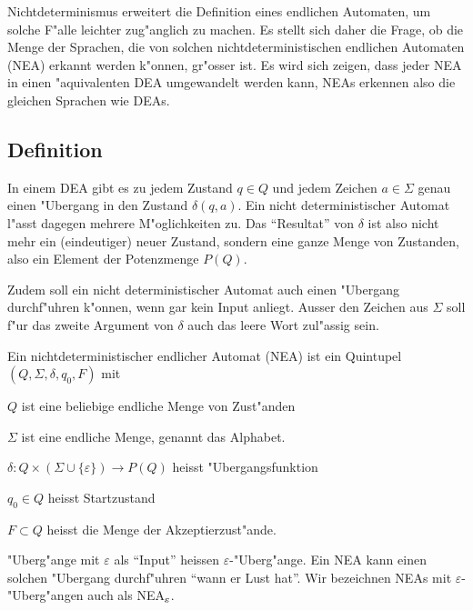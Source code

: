 Nichtdeterminismus erweitert 
die Definition eines endlichen Automaten, um solche F"alle leichter 
zug"anglich zu machen. Es stellt sich daher die Frage, ob die Menge 
der Sprachen, die von solchen nichtdeterministischen endlichen Automaten (NEA)
erkannt werden k"onnen,
gr"osser ist. Es wird sich zeigen, dass jeder NEA
in einen "aquivalenten DEA umgewandelt werden kann, NEAs erkennen also
die gleichen Sprachen wie DEAs.

\subsection{Definition\label{regulaer:definition-nea}}
In einem DEA gibt es zu jedem Zustand $q\in Q$
und jedem Zeichen $a\in\Sigma$ genau
einen "Ubergang in den Zustand $\delta(q,a)$.
Ein nicht deterministischer
Automat l"asst dagegen mehrere M"oglichkeiten zu. Das ``Resultat''
von $\delta$ ist also nicht mehr ein (eindeutiger) neuer Zustand, sondern
eine ganze Menge von Zustanden, also ein Element der Potenzmenge $P(Q)$.

Zudem soll ein
nicht deterministischer Automat auch einen "Ubergang durchf"uhren
k"onnen, wenn gar kein Input anliegt.
Ausser den Zeichen aus $\Sigma$ soll f"ur das zweite Argument
von $\delta$ auch das leere Wort zul"assig sein.

\begin{definition}\label{definition_nea}
Ein nichtdeterministischer endlicher Automat (NEA) ist ein Quintupel
$(Q,\Sigma,\delta, q_0,F)$ mit
\begin{compactenum}
\item $Q$ ist eine beliebige endliche Menge von Zust"anden
\item $\Sigma$ ist eine endliche Menge, genannt das Alphabet.
\item $\delta\colon Q\times(\Sigma\cup\{\varepsilon\})\to P(Q)$ heisst "Ubergangsfunktion
\item $q_0\in Q$ heisst Startzustand
\item $F\subset Q$ heisst die Menge der Akzeptierzust"ande.
\end{compactenum}
\end{definition}
"Uberg"ange mit $\varepsilon$ als ``Input'' heissen $\varepsilon$-"Uberg"ange.
Ein NEA kann einen solchen "Ubergang durchf"uhren ``wann er Lust hat''.
Wir bezeichnen NEAs mit $\varepsilon$-"Uberg"angen auch als
NEA$\mathstrut_\varepsilon$.

